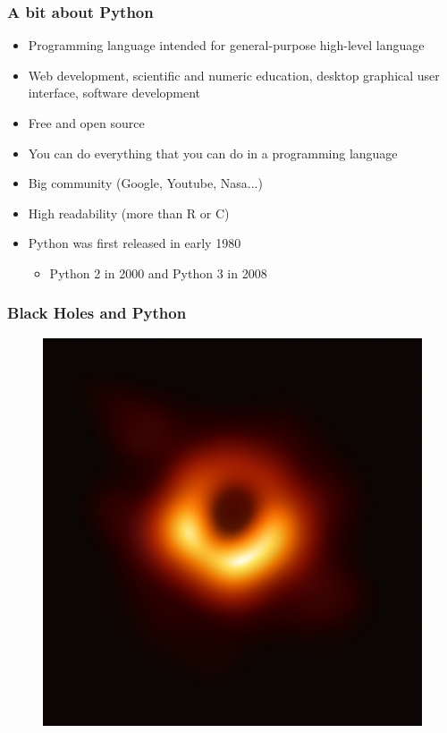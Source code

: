 \documentclass[compress, aspectratio=54]{beamer}
\begin{document}
\begin{frame}
\frametitle{A bit about Python}
\begin{itemize}

\item Programming language intended for general-purpose high-level language
\item Web development, scientific and numeric education, desktop graphical user interface, software development
\item Free and open source 
\item You can do everything that you can do in a programming language
\item Big community (Google, Youtube, Nasa...)
\item High readability (more than R or C)
\item Python was first released in early 1980
\begin{itemize}

\item Python 2 in 2000 and Python 3 in 2008
\end{itemize}
\end{itemize}

\end{frame}

\begin{frame}
\frametitle{Black Holes and Python}
\begin{figure}

\includegraphics[width=0.5\linewidth ]{../Figures/black_hole.png}
\end{figure}

\end{frame}
\end{document}
